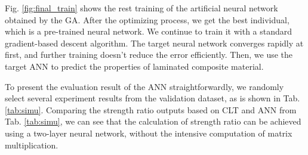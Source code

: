 Fig. \ref{fig:final_train} shows the rest training of the artificial neural
network obtained by the GA. After the optimizing process, we get the best
individual, which is a pre-trained neural network. We continue to train it with
a standard gradient-based descent algorithm. The target neural network
converges rapidly at first, and further training doesn’t reduce the error
efficiently.  Then, we use the target ANN to predict the properties of
laminated composite material.


To present the evaluation result of the ANN straightforwardly, we randomly
select several experiment results from the validation dataset, as is shown
in Tab. \ref{tab:simu}.  Comparing the strength ratio outputs based on CLT and
ANN from Tab. \ref{tab:simu}, we can see that the calculation of strength ratio
can be achieved using a two-layer neural network, without the intensive
computation of matrix multiplication.





